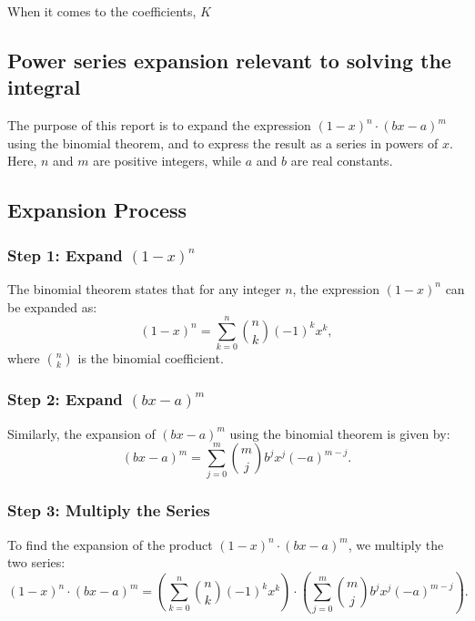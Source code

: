 When it comes to the coefficients, $K$


\subsection*{Power series expansion relevant to solving the integral}

The purpose of this report is to expand the expression \((1-x)^n \cdot (bx - a)^m\) using the binomial theorem, and to express the result as a series in powers of \(x\). Here, \(n\) and \(m\) are positive integers, while \(a\) and \(b\) are real constants.

\subsection*{Expansion Process}

\subsubsection*{Step 1: Expand \((1-x)^n\)}

The binomial theorem states that for any integer \(n\), the expression \((1-x)^n\) can be expanded as:
\begin{equation}
(1-x)^n = \sum_{k=0}^{n} \binom{n}{k} (-1)^k x^k,
\end{equation}
where \(\binom{n}{k}\) is the binomial coefficient.

\subsubsection*{Step 2: Expand \((bx - a)^m\)}

Similarly, the expansion of \((bx - a)^m\) using the binomial theorem is given by:
\begin{equation}
(bx - a)^m = \sum_{j=0}^{m} \binom{m}{j} b^j x^j (-a)^{m-j}.
\end{equation}

\subsubsection*{Step 3: Multiply the Series}

To find the expansion of the product \((1-x)^n \cdot (bx - a)^m\), we multiply the two series:
\begin{equation}
(1-x)^n \cdot (bx - a)^m = \left( \sum_{k=0}^{n} \binom{n}{k} (-1)^k x^k \right) \cdot \left( \sum_{j=0}^{m} \binom{m}{j} b^j x^j (-a)^{m-j} \right).
\end{equation}

